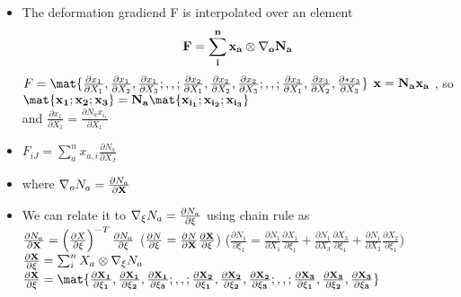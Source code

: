 	\begin{frame}
		\begin{itemize}
			\item  The deformation gradiend F is interpolated over an element
			\begin{equation}
			\mathbf{F = \sum_{i}^{n}x_a \otimes \nabla_o N_a}
			\end{equation}
			$F = \mat{\frac{\partial x_1}{\partial X_1},\frac{\partial x_1}{\partial X_2},\frac{\partial x_1}{\partial X_3} ; , , ;
					  \frac{\partial x_2}{\partial X_1},\frac{\partial x_2}{\partial X_2},\frac{\partial x_2}{\partial X_3}; , , ;
				  	  \frac{\partial x_3}{\partial X_1},\frac{\partial x_3}{\partial X_2},\frac{\partial* x_3}{\partial X_3}}$
			\qquad $\mathbf{x = N_ax_a}$ , so $\ve{\mat{x_1;x_2;x_3} = N_a\mat{x_{i_1};x_{i_2} ;x_{i_3} }}$ 			\\ and $\frac{\partial x_1}{\partial X_1} =  \frac{\partial N_a x_{i_1}}{\partial X_1}$
			\item $F_{iJ} = \sum_{a}^{n} x_{a,i} \frac{\partial N_a}{\partial X_J}$
			\item where $\nabla_o N_a = \frac{\partial N_a}{\partial \mathbf{X}}$ 
			\item We can relate it to $\nabla_{\xi} N_a = \frac{\partial N_a}{\partial \mathbf{\xi}}$ using chain rule as\\
			$\frac{\partial N_a}{\partial \mathbf{X}} = \left(\frac{\partial X}{\partial \mathbf{\xi}} \right)^{-T}\frac{\partial N_a}{\partial \mathbf{\xi}}$ \qquad ($\frac{\partial N}{\partial \xi} = \frac{\partial N}{\partial \mathbf{X}}\frac{\partial \mathbf{X}}{\partial \xi}$) \qquad ($\frac{\partial N_1}{\partial \xi_1} = \frac{\partial N_1}{\partial X_1}\frac{\partial X_1}{\partial \xi_1} + \frac{\partial N_1}{\partial X_3}\frac{\partial X_3}{\partial \xi_1}+ \frac{\partial N_1}{\partial X_2}\frac{\partial X_2}{\partial \xi_1}$) \\ 
			$\frac{\partial \mathbf{X}}{\partial \mathbf{\xi}} =  \sum_{i}^{n}X_a \otimes \nabla_{\xi} N_a$ 
			\qquad  \qquad 
			$\ve{\frac{\partial X}{\partial \xi} = \mat{\frac{\partial X_1}{\partial \xi_1},\frac{\partial X_1}{\partial \xi_2},\frac{\partial X_1}{\partial \xi_3} ; , , ;
			\frac{\partial X_2}{\partial \xi_1},\frac{\partial X_2}{\partial \xi_2},\frac{\partial X_2}{\partial \xi_3}; , , ;
			\frac{\partial X_3}{\partial \xi_1},\frac{\partial X_3}{\partial \xi_2},\frac{\partial X_3}{\partial \xi_3}}}$

		\end{itemize}	\end{frame}
	
